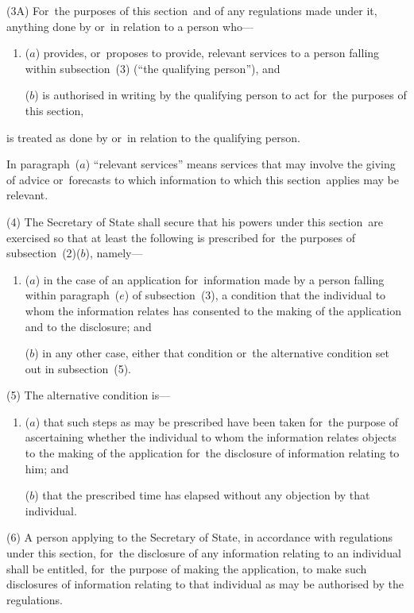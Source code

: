 \documentclass[12pt,a4paper]{article}
\begin{document}
(3A) For~the purposes of this section~and of any regulations made under it, anything done by or~in relation to a person who—
\begin{enumerate}\item[]
($a$) provides, or~proposes to provide, relevant services to a person falling within subsection~(3) (“the qualifying person”), and

($b$) is authorised in writing by the qualifying person to act for~the purposes of this section,
\end{enumerate}
is treated as done by or~in relation to the qualifying person.

In paragraph~($a$) “relevant services” means services that may involve the giving of advice or~forecasts to which information to which this section~applies may be relevant.

(4) The Secretary of State shall secure that his powers under this section~are exercised so that at least the following is prescribed for~the purposes of subsection~(2)($b$), namely—
\begin{enumerate}\item[]
($a$) in the case of an application for~information made by a person falling within paragraph~($e$)  of subsection~(3), a condition that the individual to whom the information relates has consented to the making of the application and to the disclosure; and

($b$) in any other case, either that condition or~the alternative condition set out in subsection~(5).
\end{enumerate}

(5) The alternative condition is—
\begin{enumerate}\item[]
($a$) that such steps as may be prescribed have been taken for~the purpose of ascertaining whether the individual to whom the information relates objects to the making of the application for~the disclosure of information relating to him; and

($b$) that the prescribed time has elapsed without any objection by that individual.
\end{enumerate}

(6) A person applying to the Secretary of State, in accordance with regulations under this section, for~the disclosure of any information relating to an individual shall be entitled, for~the purpose of making the application, to make such disclosures of information relating to that individual as may be authorised by the regulations.
\end{document}
